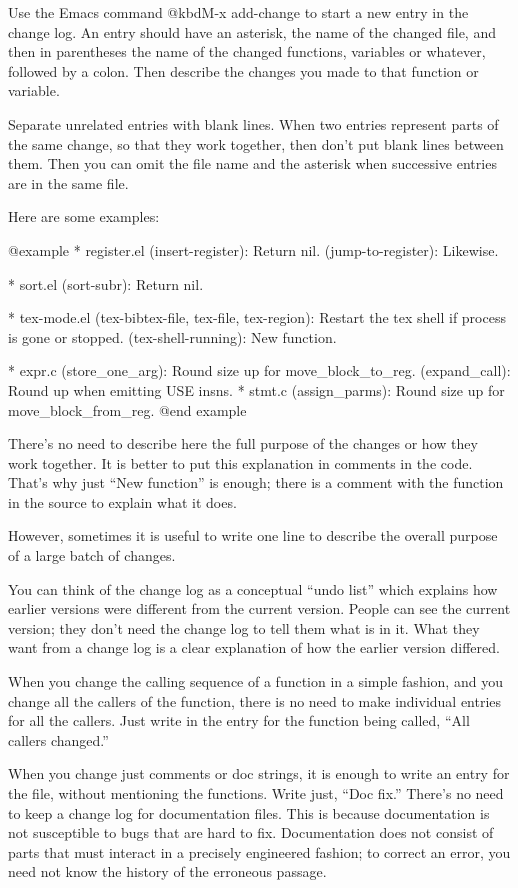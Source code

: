 Use the Emacs command @kbd{M-x add-change} to start a new entry in the
change log.  An entry should have an asterisk, the name of the changed
file, and then in parentheses the name of the changed functions,
variables or whatever, followed by a colon.  Then describe the changes
you made to that function or variable.

Separate unrelated entries with blank lines.  When two entries
represent parts of the same change, so that they work together, then
don't put blank lines between them.  Then you can omit the file name
and the asterisk when successive entries are in the same file.

Here are some examples:

@example
* register.el (insert-register): Return nil.
(jump-to-register): Likewise.

* sort.el (sort-subr): Return nil.

* tex-mode.el (tex-bibtex-file, tex-file, tex-region):
Restart the tex shell if process is gone or stopped.
(tex-shell-running): New function.

* expr.c (store_one_arg): Round size up for move_block_to_reg.
(expand_call): Round up when emitting USE insns.
* stmt.c (assign_parms): Round size up for move_block_from_reg.
@end example

There's no need to describe here the full purpose of the changes or how
they work together.  It is better to put this explanation in comments in
the code.  That's why just ``New function'' is enough; there is a
comment with the function in the source to explain what it does.

However, sometimes it is useful to write one line to describe the
overall purpose of a large batch of changes.

You can think of the change log as a conceptual ``undo list'' which
explains how earlier versions were different from the current version.
People can see the current version; they don't need the change log
to tell them what is in it.  What they want from a change log is a
clear explanation of how the earlier version differed.

When you change the calling sequence of a function in a simple
fashion, and you change all the callers of the function, there is no
need to make individual entries for all the callers.  Just write in
the entry for the function being called, ``All callers changed.''

When you change just comments or doc strings, it is enough to write an
entry for the file, without mentioning the functions.  Write just,
``Doc fix.''  There's no need to keep a change log for documentation
files.  This is because documentation is not susceptible to bugs that
are hard to fix.  Documentation does not consist of parts that must
interact in a precisely engineered fashion; to correct an error, you
need not know the history of the erroneous passage.



